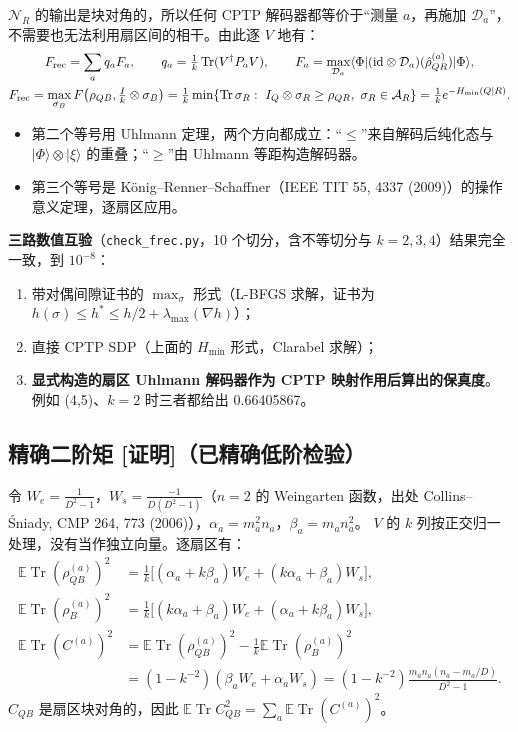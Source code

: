 \documentclass[11pt,a4paper,UTF8]{ctexart}
\newcommand{\Tr}{\operatorname{Tr}}
\newcommand{\E}{\mathbb{E}}
\newcommand{\Frec}{F_{\rm rec}}
\newcommand{\code}[1]{\texttt{#1}}
\newcommand{\tagP}{\texorpdfstring{\textcolor{cP}{\textbf{[证明]}}}{[证明]}}
\begin{document}
$\mathcal N_R$ 的输出是块对角的，所以任何 CPTP 解码器都等价于“测量 $a$，再施加 $\mathcal D_a$”，不需要也无法利用扇区间的相干。由此逐 $V$ 地有：
\begin{gather*}
\Frec=\sum_aq_aF_a,\qquad q_a=\tfrac1k\Tr(V^\dagger P_aV),\qquad
F_a=\max_{\mathcal D_a}\langle\Phi|(\mathrm{id}\otimes\mathcal D_a)(\hat\rho^{(a)}_{QR})|\Phi\rangle,\\
\Frec=\max_{\sigma_B}F\big(\rho_{QB},\tfrac{I}{k}\otimes\sigma_B\big)
=\tfrac1k\min\{\Tr\sigma_R:\ I_Q\otimes\sigma_R\ge\rho_{QR},\ \sigma_R\in\mathcal A_R\}
=\tfrac1ke^{-H_{\min}(Q|R)}.
\end{gather*}
\begin{itemize}
  \item 第二个等号用 Uhlmann 定理，两个方向都成立：“$\le$”来自解码后纯化态与 $|\Phi\rangle\otimes|\xi\rangle$ 的重叠；“$\ge$”由 Uhlmann 等距构造解码器。
  \item 第三个等号是 König--Renner--Schaffner（IEEE TIT 55, 4337 (2009)）的操作意义定理，逐扇区应用。
\end{itemize}
\textbf{三路数值互验}（\code{check\_frec.py}，10 个切分，含不等切分与 $k=2,3,4$）结果完全一致，到 $10^{-8}$：
\begin{enumerate}
  \item 带对偶间隙证书的 $\max_\sigma$ 形式（L-BFGS 求解，证书为 $h(\sigma)\le h^{*}\le h/2+\lambda_{\max}(\nabla h)$）；
  \item 直接 CPTP SDP（上面的 $H_{\min}$ 形式，Clarabel 求解）；
  \item \textbf{显式构造的扇区 Uhlmann 解码器作为 CPTP 映射作用后算出的保真度}。例如 (4,5)、$k=2$ 时三者都给出 0.66405867。
\end{enumerate}

\subsection{精确二阶矩 \tagP（已精确低阶检验）}\label{ss:B-mom}
令 $W_e=\frac1{D^2-1}$，$W_s=\frac{-1}{D(D^2-1)}$（$n=2$ 的 Weingarten 函数，出处 Collins--Śniady, CMP 264, 773 (2006)），$\alpha_a=m_a^2n_a$，$\beta_a=m_an_a^2$。
$V$ 的 $k$ 列按正交归一处理，没有当作独立向量。逐扇区有：
\begin{align*}
\E\Tr(\rho^{(a)}_{QB})^2&=\tfrac1k\big[(\alpha_a+k\beta_a)W_e+(k\alpha_a+\beta_a)W_s\big],\\
\E\Tr(\rho^{(a)}_{B})^2&=\tfrac1k\big[(k\alpha_a+\beta_a)W_e+(\alpha_a+k\beta_a)W_s\big],\\
\E\Tr(C^{(a)})^2&=\E\Tr(\rho^{(a)}_{QB})^2-\tfrac1k\E\Tr(\rho^{(a)}_B)^2\\
&=(1-k^{-2})(\beta_aW_e+\alpha_aW_s)=(1-k^{-2})\frac{m_an_a(n_a-m_a/D)}{D^2-1}.
\end{align*}
$C_{QB}$ 是扇区块对角的，因此 $\E\Tr C_{QB}^2=\sum_a\E\Tr(C^{(a)})^2$。
\end{document}
